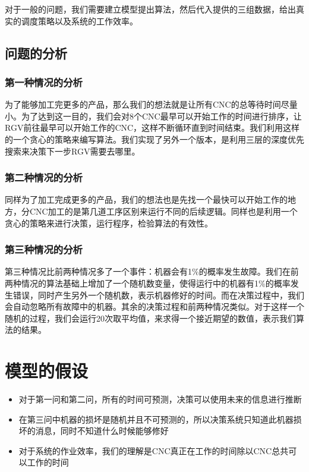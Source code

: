 \documentclass{cumcmthesis}
\begin{document}
对于一般的问题，我们需要建立模型提出算法，然后代入提供的三组数据，给出真实的调度策略以及系统的工作效率。

\subsection{问题的分析}

\subsubsection{第一种情况的分析}

为了能够加工完更多的产品，那么我们的想法就是让所有CNC的总等待时间尽量小。为了达到这一目的，我们会对8个CNC最早可以开始工作的时间进行排序，让RGV前往最早可以开始工作的CNC，这样不断循环直到时间结束。我们利用这样的一个贪心的策略来编写算法。我们实现了另外一个版本，是利用三层的深度优先搜索来决策下一步RGV需要去哪里。

\subsubsection{第二种情况的分析}

同样为了加工完成更多的产品，我们的想法也是先找一个最快可以开始工作的地方，分CNC加工的是第几道工序区别来运行不同的后续逻辑。同样也是利用一个贪心的策略来进行决策，运行程序，检验算法的有效性。

\subsubsection{第三种情况的分析}

第三种情况比前两种情况多了一个事件：机器会有1\%的概率发生故障。我们在前两种情况的算法基础上增加了一个随机数变量，使得运行中的机器有1\%的概率发生错误，同时产生另外一个随机数，表示机器修好的时间。而在决策过程中，我们会自动忽略所有故障中的机器。其余的决策过程和前两种情况类似。对于这样一个随机的过程，我们会运行20次取平均值，来求得一个接近期望的数值，表示我们算法的结果。


\section{模型的假设}

\begin{itemize}
\item 对于第一问和第二问，所有的时间可预测，决策可以使用未来的信息进行推断
\item 在第三问中机器的损坏是随机并且不可预测的，所以决策系统只知道此机器损坏的消息，同时不知道什么时候能够修好
\item 对于系统的作业效率，我们的理解是CNC真正在工作的时间除以CNC总共可以工作的时间
\end{itemize}
\end{document}
